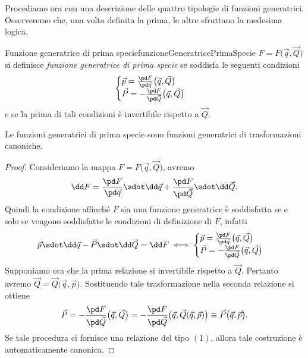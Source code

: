 Procediamo ora con una descrizione delle quattro tipologie di funzioni generatrici.
Osserveremo che, una volta definita la prima, le altre sfruttano la medesima logica.

\begin{defn}{Funzione generatrice di prima specie}{funzioneGeneratricePrimaSpecie}
	\(F=F\big(\vec{q},\vec{Q}\big)\) si definisce \emph{funzione generatrice di prima specie} se soddisfa le seguenti condizioni
	\[
		\begin{cases}
			\vec{p} = \frac{\pd F}{\pd\vec{q}}\big(\vec{q},\vec{Q}\big) \\
			\vec{P} = -\frac{\pd F}{\pd\vec{Q}}\big(\vec{q},\vec{Q}\big)
		\end{cases}
	\]
	e se la prima di tali condizioni è invertibile rispetto a \(\vec{Q}\).
\end{defn}

\begin{pr}
	Le funzioni generatrici di prima specie sono funzioni generatrici di trasformazioni canoniche.
\end{pr}

\begin{proof}
	Consideriamo la mappa \(F=F\big(\vec{q},\vec{Q}\big)\), avremo
	\[
		\dd F = \frac{\pd F}{\pd\vec{q}}\sdot \dd\vec{q} + \frac{\pd F}{\pd\vec{Q}} \sdot \dd\vec{Q}.
	\]
	Quindi la condizione affinché \(F\) sia una funzione generatrice è soddisfatta se e solo se vengono soddisfatte le condizioni di definizione di \(F\), infatti
	\[
		\vec{p} \sdot \dd\vec{q} - \vec{P} \sdot \dd\vec{Q} = \dd F \iff 	\begin{cases}
			\vec{p} = \frac{\pd F}{\pd\vec{q}}\big(\vec{q},\vec{Q}\big) \\
			\vec{P} = -\frac{\pd F}{\pd\vec{Q}}\big(\vec{q},\vec{Q}\big)
		\end{cases}
	\]
	Supponiamo ora che la prima relazione si invertibile rispetto a \(\vec{Q}\). Pertanto avremo \(\vec{Q}=\vec{Q}\big(\vec{q},\vec{p}\big)\).
	Sostituendo tale trasformazione nella seconda relazione si ottiene
	\[
		\vec{P} = -\frac{\pd F}{\pd\vec{Q}}\big(\vec{q},\vec{Q}\big) = -\frac{\pd F}{\pd\vec{Q}}\big(\vec{q},\vec{Q}(\vec{q},\vec{p})\big) \equiv \vec{P}\big(\vec{q},\vec{p}\big).
	\]
	Se tale procedura ci fornisce una relazione del tipo \((1)\), allora tale costruzione è automaticamente canonica.
\end{proof}

